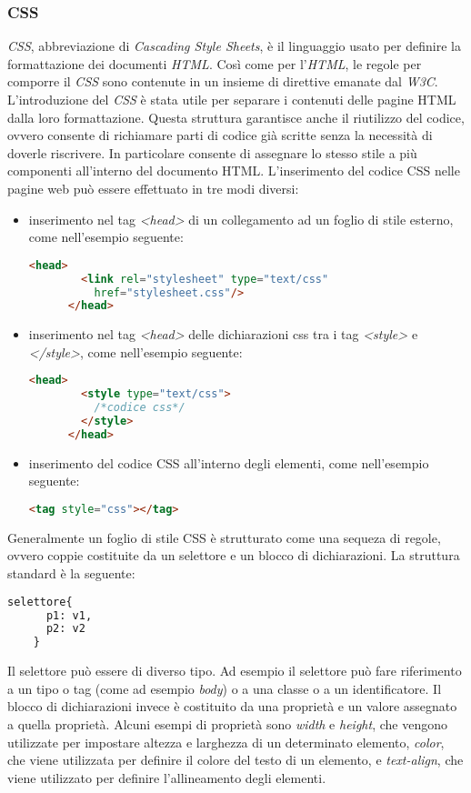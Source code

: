   \subsubsection{CSS}
  \textit{CSS}, abbreviazione di \textit{Cascading Style Sheets}, è il linguaggio usato per definire la formattazione dei documenti
  \textit{HTML}. Così come per l'\textit{HTML}, le regole per comporre il \textit{CSS} sono contenute in un insieme di direttive
  emanate dal \textit{W3C}. L'introduzione del \textit{CSS} è stata utile per separare i contenuti delle pagine HTML dalla loro
  formattazione. Questa struttura garantisce anche il riutilizzo del codice, ovvero consente di richiamare parti di codice già scritte
  senza la necessità di doverle riscrivere. In particolare consente di assegnare lo stesso stile a più componenti all'interno
  del documento HTML. L'inserimento del codice CSS nelle pagine web può essere effettuato in tre modi diversi: 
  \begin{itemize}
    \item inserimento nel tag \textit{\textless head\textgreater} di un collegamento ad un foglio di stile esterno, come
    nell'esempio seguente:
    \begin{lstlisting}[language=html]
      <head>
        <link rel="stylesheet" type="text/css" 
          href="stylesheet.css"/>
      </head>
    \end{lstlisting}
    \item inserimento nel tag \textit{\textless head\textgreater} delle dichiarazioni css tra i tag 
    \textit{\textless style\textgreater} e \textit{\textless /style\textgreater}, come nell'esempio seguente:
    \begin{lstlisting}[language=html]
      <head>
        <style type="text/css">
          /*codice css*/
        </style>
      </head>
    \end{lstlisting}
    \item inserimento del codice CSS all'interno degli elementi, come nell'esempio seguente:
    \begin{lstlisting}[language=html]
      <tag style="css"></tag>
    \end{lstlisting}
  \end{itemize}
  Generalmente un foglio di stile CSS è strutturato come una sequeza di regole, ovvero coppie costituite da un selettore e un
  blocco di dichiarazioni. La struttura standard è la seguente:
  \begin{lstlisting}[language=html]
    selettore{
      p1: v1,
      p2: v2
    }
  \end{lstlisting}
  Il selettore può essere di diverso tipo. Ad esempio il selettore può fare riferimento a un tipo o tag (come ad esempio 
  \textit{body}) o a una classe o a un identificatore. Il blocco di dichiarazioni invece è costituito da una proprietà e un
  valore assegnato a quella proprietà. Alcuni esempi di proprietà sono \textit{width} e \textit{height}, che vengono utilizzate
  per impostare altezza e larghezza di un determinato elemento, \textit{color}, che viene utilizzata per definire il colore
  del testo di un elemento, e \textit{text-align}, che viene utilizzato per definire l'allineamento degli elementi.
  
